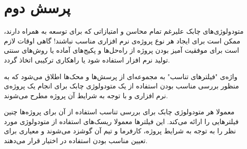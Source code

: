 
\section{پرسش دوم}
متودولوژی‌های چابک علیرغم تمام محاسن و امتیازاتی که برای توسعه به همراه دارند، ممکن است برای ایجاد هر نوع پروژه‌ی نرم افزاری مناسب نباشند!
گاهی اوقات لازم است برای موفقیت آمیز بودن پروژه از راه‌حل‌ها و پکیج‌های آماده یا روش‌های سنتی تولید نرم افزار استفاده شود یا راهکاری ترکیبی اتخاذ گردد.

واژه‌ی "فیلتر‌های تناسب"
به مجموعه‌ای از  پرسش‌ها و محک‌ها اطلاق می‌شود که به منظور بررسی مناسب بودن استفاده از یک متودولوژی چابک برای انجام یک پروژه‌ی نرم افزاری و با توجه به شرایط آن پروژه مطرح می‌شوند.

معمولا هر متودولوژی چابک برای  بررسی تناسب استفاده از آن برای پروژه‌ها چنین فیلتر‌هایی را ارائه می‌کند. این فیلتر‌ها معمولا ریسک‌های استفاده از متودولوژی مورد نظر را به توجه به شرایط پروژه، کارفرما و تیم آن گوشزد می‌شوند و معیاری برای تعیین مناسب بودن استفاده در اختیار قرار می‌دهند.



